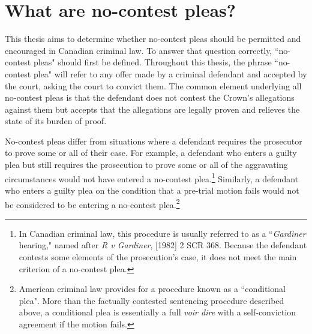 \chapter{What are no-contest pleas?}

This thesis aims to determine whether no-contest pleas should be permitted and encouraged in Canadian criminal law. To answer that question correctly, ``no-contest pleas" should first be defined. Throughout this thesis, the phrase ``no-contest plea" will refer to any offer made by a criminal defendant and accepted by the court, asking the court to convict them. The common element underlying all no-contest pleas is that the defendant does not contest the Crown's allegations against them but accepts that the allegations are legally proven and relieves the state of its burden of proof.

No-contest pleas differ from situations where a defendant requires the prosecutor to prove some or all of their case. For example, a defendant who enters a guilty plea but still requires the prosecution to prove some or all of the aggravating circumstances would not have entered a no-contest plea.\footnote{In Canadian criminal law, this procedure is usually referred to as a ``\textit{Gardiner} hearing," named after \textit{R v Gardiner}, [1982] 2 SCR 368. Because the defendant contests some elements of the prosecution's case, it does not meet the main criterion of a no-contest plea.} Similarly, a defendant who enters a guilty plea on the condition that a pre-trial motion fails would not be considered to be entering a no-contest plea.\footnote{American criminal law provides for a procedure known as a ``conditional plea". More than the factually contested sentencing procedure described above, a conditional plea is essentially a full \textit{voir dire} with a self-conviction agreement if the motion fails.}